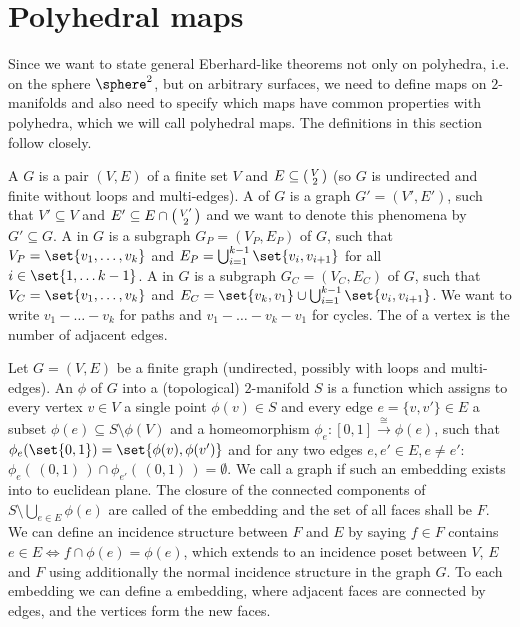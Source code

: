 \section{Polyhedral maps}\label{sec:polymap}

Since we want to state general {\sc Eberhard}-like theorems not only on polyhedra, i.e. on the sphere $\sphere^2$, but on arbitrary surfaces, we need to define maps on $2$-manifolds and also need to specify which maps have common properties with polyhedra, which we will call polyhedral maps. The definitions in this section follow \cite{brehm2004polyhedralmaps} closely.

\begin{definition}
  A  $G$ is a pair $(V, E)$ of a finite set $V$ and $E \subseteq \begin{psmallmatrix}V\\2\end{psmallmatrix}$ (so $G$ is undirected and finite without loops and multi-edges). A  of $G$ is a graph $G' = (V', E')$, such that $V' \subseteq V$ and $E' \subseteq E \cap  \begin{psmallmatrix}V'\\2\end{psmallmatrix}$ and we want to denote this phenomena by $G' \subseteq G$. A  in $G$ is a subgraph $G_P = (V_P, E_P)$ of $G$, such that $V_P = \set{v_1, \dots, v_k}$ and $E_P = \bigcup_{i = 1}^{k-1}\set{v_i, v_{i+1}}$ for all $i \in \set{1, \dots k - 1}$. A  in $G$ is a subgraph $G_C = (V_C, E_C)$ of $G$, such that $V_C = \set{v_1, \dots, v_k}$ and $E_C = \set{v_k, v_1} \cup \bigcup_{i = 1}^{k-1}\set{v_i, v_{i+1}}$. We want to write $v_1 - \dots - v_k$ for paths and $v_1 - \dots - v_k - v_1$ for cycles. The  of a vertex is the number of adjacent edges.
\end{definition}

\begin{definition} Let $G = (V, E)$ be a finite graph (undirected, possibly with loops and multi-edges). An  $\phi$ of $G$ into a (topological) $2$-manifold $S$ is a function which assigns to every vertex $v \in V$ a single point $\phi(v) \in S$ and every edge $e = \{v, v'\} \in E$ a subset $\phi(e) \subseteq S \setminus \phi(V)$ and a homeomorphism $\phi_e : [0, 1] \stackrel{\cong}{\longrightarrow} \phi(e)$, such that $\phi_e(\set{0, 1}) = \set{\phi(v), \phi(v')}$ and for any two edges $e, e' \in E, e \neq e'$: $\phi_e(\,(0,1)\,) \cap \phi_{e'}(\,(0,1)\,) = \emptyset$. We call a graph  if such an embedding exists into to euclidean plane. The closure of the connected components of $S \setminus \bigcup_{e \in E} \phi(e)$ are called  of the embedding and the set of all faces shall be $F$. We can define an incidence structure between $F$ and $E$ by saying $f \in F$ contains $e \in E \iff f \cap \phi(e) = \phi(e)$, which extends to an incidence poset between $V$, $E$ and $F$ using additionally the normal incidence structure in the graph $G$. To each embedding we can define a  embedding, where adjacent faces are connected by edges, and the vertices form the new faces.
\end{definition}

